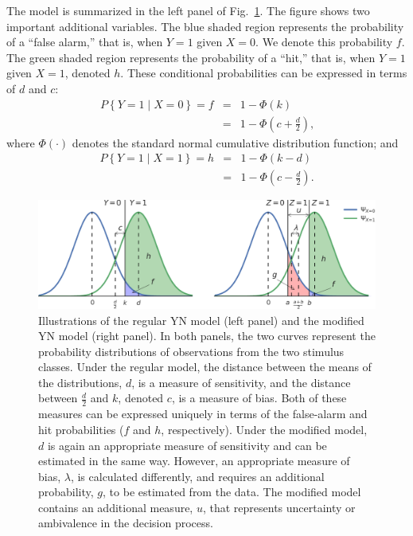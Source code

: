 \documentclass[man]{apa6}
\begin{document}
The model is summarized in the left panel of Fig.~\ref{fig:Figure1}. The figure shows two important additional variables. The blue shaded region represents the probability of a ``false alarm,'' that is, when $Y=1$ given $X=0$. We denote this probability $f$. The green shaded region represents the probability of a ``hit,'' that is, when $Y=1$ given $X=1$, denoted $h$. These conditional probabilities can be expressed in terms of $d$ and $c$:
\begin{eqnarray*}
P\left\{Y=1\mid{}X=0\right\}=f&=&1-\Phi\left(k\right)\\
&=&1-\Phi\left(c+\frac{d}{2}\right)\textrm{,}
\end{eqnarray*}where $\Phi\left(\cdot\right)$ denotes the standard normal cumulative distribution function; and
\begin{eqnarray*}
P\left\{Y=1\mid{}X=1\right\}=h&=&1-\Phi\left(k-d\right)\\
&=&1-\Phi\left(c-\frac{d}{2}\right)\textrm{.}
\end{eqnarray*}

\begin{figure}
\includegraphics[width=1\textwidth]{fig1.pdf}
\caption{Illustrations of the regular YN model (left panel) and the modified YN model (right panel). In both panels, the two curves represent the probability distributions of observations from the two stimulus classes. Under the regular model, the distance between the means of the distributions, $d$, is a measure of sensitivity, and the distance between $\frac{d}{2}$ and $k$, denoted $c$, is a measure of bias. Both of these measures can be expressed uniquely in terms of the false-alarm and hit probabilities ($f$ and $h$, respectively). Under the modified model, $d$ is again an appropriate measure of sensitivity and can be estimated in the same way. However, an appropriate measure of bias, $\lambda$, is calculated differently, and requires an additional probability, $g$, to be estimated from the data. The modified model contains an additional measure, $u$, that represents uncertainty or ambivalence in the decision process.}
\label{fig:Figure1}
\end{figure}
\end{document}

